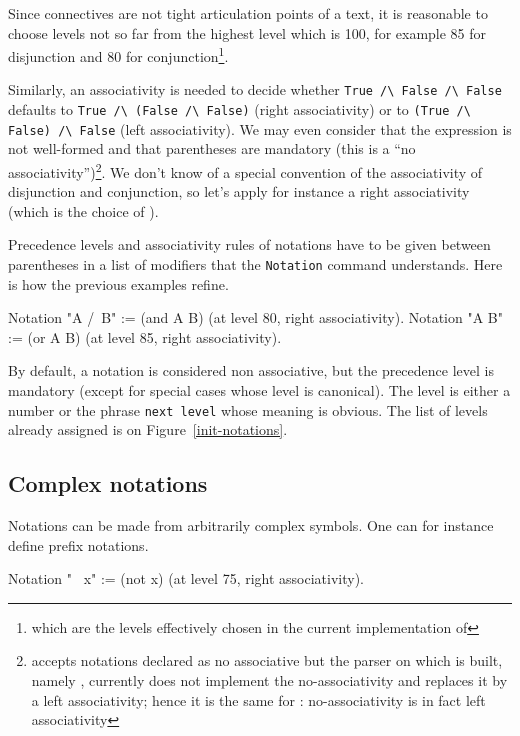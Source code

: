Since connectives are not tight articulation points of a text, it
is reasonable to choose levels not so far from the highest level which
is 100, for example 85 for disjunction and 80 for
conjunction\footnote{which are the levels effectively chosen in the
current implementation of {\Coq}}.

Similarly, an associativity is needed to decide whether {\tt True \verb=/\=
False \verb=/\= False} defaults to {\tt True \verb=/\= (False
\verb=/\= False)} (right associativity) or to {\tt (True
\verb=/\= False) \verb=/\= False} (left associativity). We may
even consider that the expression is not well-formed and that
parentheses are mandatory (this is a ``no associativity'')\footnote{
{\Coq} accepts notations declared as no associative but the parser on
which {\Coq} is built, namely {\camlpppp}, currently does not implement the
no-associativity and replaces it by a left associativity; hence it is
the same for {\Coq}: no-associativity is in fact left associativity}.
We don't know of a special convention of the associativity of
disjunction and conjunction, so let's apply for instance a right
associativity (which is the choice of {\Coq}).

Precedence levels and associativity rules of notations have to be
given between parentheses in a list of modifiers that the
\texttt{Notation} command understands. Here is how the previous
examples refine.

\begin{coq_example*}
Notation "A /\ B" := (and A B) (at level 80, right associativity).
Notation "A \/ B" := (or A B)  (at level 85, right associativity).
\end{coq_example*}

By default, a notation is considered non associative, but the
precedence level is mandatory (except for special cases whose level is
canonical). The level is either a number or the phrase {\tt next
level} whose meaning is obvious. The list of levels already assigned
is on Figure~\ref{init-notations}.

\subsection{Complex notations}

Notations can be made from arbitrarily complex symbols. One can for
instance define prefix notations.

\begin{coq_example*}
Notation "~ x" := (not x) (at level 75, right associativity).
\end{coq_example*}

